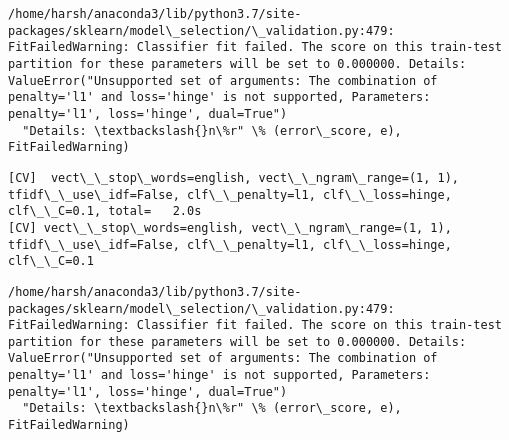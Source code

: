 \documentclass[11pt]{article}
\begin{document}
    \begin{Verbatim}[commandchars=\\\{\}]
/home/harsh/anaconda3/lib/python3.7/site-packages/sklearn/model\_selection/\_validation.py:479: FitFailedWarning: Classifier fit failed. The score on this train-test partition for these parameters will be set to 0.000000. Details: 
ValueError("Unsupported set of arguments: The combination of penalty='l1' and loss='hinge' is not supported, Parameters: penalty='l1', loss='hinge', dual=True")
  "Details: \textbackslash{}n\%r" \% (error\_score, e), FitFailedWarning)

    \end{Verbatim}

    \begin{Verbatim}[commandchars=\\\{\}]
[CV]  vect\_\_stop\_words=english, vect\_\_ngram\_range=(1, 1), tfidf\_\_use\_idf=False, clf\_\_penalty=l1, clf\_\_loss=hinge, clf\_\_C=0.1, total=   2.0s
[CV] vect\_\_stop\_words=english, vect\_\_ngram\_range=(1, 1), tfidf\_\_use\_idf=False, clf\_\_penalty=l1, clf\_\_loss=hinge, clf\_\_C=0.1 

    \end{Verbatim}

    \begin{Verbatim}[commandchars=\\\{\}]
/home/harsh/anaconda3/lib/python3.7/site-packages/sklearn/model\_selection/\_validation.py:479: FitFailedWarning: Classifier fit failed. The score on this train-test partition for these parameters will be set to 0.000000. Details: 
ValueError("Unsupported set of arguments: The combination of penalty='l1' and loss='hinge' is not supported, Parameters: penalty='l1', loss='hinge', dual=True")
  "Details: \textbackslash{}n\%r" \% (error\_score, e), FitFailedWarning)

    \end{Verbatim}
\end{document}
